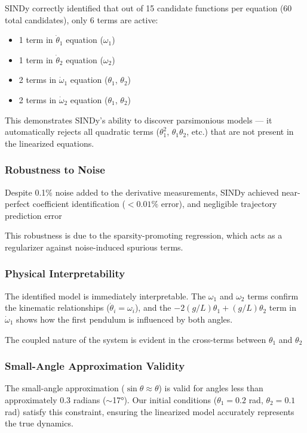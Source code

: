 \documentclass[12pt,a4paper]{article}
\begin{document}
SINDy correctly identified that out of 15 candidate functions per equation (60 total candidates), only 6 terms are active:
\begin{itemize}
    \item 1 term in $\dot{\theta}_1$ equation ($\omega_1$)
    \item 1 term in $\dot{\theta}_2$ equation ($\omega_2$)
    \item 2 terms in $\dot{\omega}_1$ equation ($\theta_1$, $\theta_2$)
    \item 2 terms in $\dot{\omega}_2$ equation ($\theta_1$, $\theta_2$)
\end{itemize}

This demonstrates SINDy's ability to discover parsimonious models --- it automatically rejects all quadratic terms ($\theta_1^2$, $\theta_1\theta_2$, etc.) that are not present in the linearized equations.

\subsubsection{Robustness to Noise}

Despite 0.1\% noise added to the derivative measurements, SINDy achieved near-perfect coefficient identification ($<0.01\%$ error), and negligible trajectory prediction error

This robustness is due to the sparsity-promoting regression, which acts as a regularizer against noise-induced spurious terms.

\subsubsection{Physical Interpretability}

The identified model is immediately interpretable. The $\omega_1$ and $\omega_2$ terms confirm the kinematic relationships ($\dot{\theta}_i = \omega_i$), and the $-2(g/L)\theta_1 + (g/L)\theta_2$ term in $\dot{\omega}_1$ shows how the first pendulum is influenced by both angles.

The coupled nature of the system is evident in the cross-terms between $\theta_1$ and $\theta_2$

\subsubsection{Small-Angle Approximation Validity}

The small-angle approximation ($\sin\theta \approx \theta$) is valid for angles less than approximately 0.3 radians ($\sim$17°). Our initial conditions ($\theta_1 = 0.2$ rad, $\theta_2 = 0.1$ rad) satisfy this constraint, ensuring the linearized model accurately represents the true dynamics.
\end{document}

